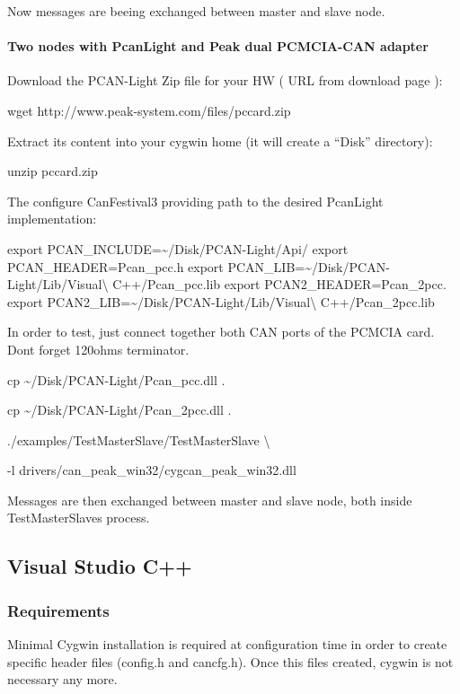 \documentclass[a4paper,12pt]{book}
\begin{document}
Now messages are beeing exchanged between master and slave node.

\paragraph{Two nodes with PcanLight and Peak dual PCMCIA{}-CAN adapter}
Download the PCAN{}-Light Zip file for your HW ( URL from download page
): 

{\ttfamily
wget http://www.peak{}-system.com/files/pccard.zip}

Extract its content into your cygwin home (it will create a ``Disk''
directory):

{\ttfamily
unzip pccard.zip}

The configure CanFestival3 providing path to the desired PcanLight
implementation:

{\ttfamily
export PCAN\_INCLUDE=\~{}/Disk/PCAN{}-Light/Api/\newline
export PCAN\_HEADER=Pcan\_pcc.h\newline
export PCAN\_LIB=\~{}/Disk/PCAN{}-Light/Lib/Visual{\textbackslash}
C++/Pcan\_pcc.lib\newline
export PCAN2\_HEADER=Pcan\_2pcc.\newline
export PCAN2\_LIB=\~{}/Disk/PCAN{}-Light/Lib/Visual{\textbackslash}
C++/Pcan\_2pcc.lib}

In order to test, just connect together both CAN ports of the PCMCIA
card. Don{\textquotesingle}t forget 120ohms terminator.

{\ttfamily
cp \~{}/Disk/PCAN{}-Light/Pcan\_pcc.dll .}

{\ttfamily
cp \~{}/Disk/PCAN{}-Light/Pcan\_2pcc.dll .}

{\ttfamily
./examples/TestMasterSlave/TestMasterSlave {\textbackslash}}

{\ttfamily
  {}-l drivers/can\_peak\_win32/cygcan\_peak\_win32.dll}

Messages are then exchanged between master and slave node, both inside
TestMasterSlave{\textquotesingle}s process.

\subsection{Visual Studio C++}
\subsubsection{Requirements}
Minimal Cygwin installation is required at configuration time in order
to create specific header files (config.h and cancfg.h). Once this
files created, cygwin is not necessary any more.
\end{document}

